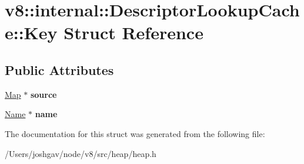 \hypertarget{structv8_1_1internal_1_1_descriptor_lookup_cache_1_1_key}{}\section{v8\+:\+:internal\+:\+:Descriptor\+Lookup\+Cache\+:\+:Key Struct Reference}
\label{structv8_1_1internal_1_1_descriptor_lookup_cache_1_1_key}
\subsection*{Public Attributes}
\begin{DoxyCompactItemize}
\item 
\hyperlink{classv8_1_1internal_1_1_map}{Map} $\ast$ {\bfseries source}\hypertarget{structv8_1_1internal_1_1_descriptor_lookup_cache_1_1_key_af9074eae7dee197681e774ced3c8b9e4}{}\label{structv8_1_1internal_1_1_descriptor_lookup_cache_1_1_key_af9074eae7dee197681e774ced3c8b9e4}

\item 
\hyperlink{classv8_1_1internal_1_1_name}{Name} $\ast$ {\bfseries name}\hypertarget{structv8_1_1internal_1_1_descriptor_lookup_cache_1_1_key_a9f761fa05f6a0303ebbbdb2728a54db4}{}\label{structv8_1_1internal_1_1_descriptor_lookup_cache_1_1_key_a9f761fa05f6a0303ebbbdb2728a54db4}

\end{DoxyCompactItemize}


The documentation for this struct was generated from the following file\+:\begin{DoxyCompactItemize}
\item 
/\+Users/joshgav/node/v8/src/heap/heap.\+h\end{DoxyCompactItemize}
